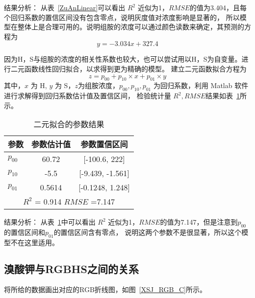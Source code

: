     结果分析： 从表~\ref{ZuAnLinear}可以看出 $R^2$ 近似为1，$RMSE$的值为3.404，且每个回归系数的置信区间没有包含零点，说明灰度值对浓度影响是显著的，
    所以模型在整体上是合理可用的。说明组胺的浓度可以通过颜色读数来确定，其预测的方程为
    $$y = -3.034x + 327.4 $$
    
    因为H，S与组胺的浓度的相关性系数也较大，也可以尝试用以H，S为自变量。进行二元函数线性回归拟合，以求得到更为精确的模型。
    建立二元函数拟合方程为
    $$ z = p_{00} + p_{10} \times x + p_{01} \times y$$
    其中，$x$ 为 H, $y$ 为 S，$z$为组胺浓度，$p_{00},p_{10},p_{01}$ 为回归系数，利用 Matlab 软件进行求解得到回归系数估计值及置信区间，
    检验统计量 $R^2, RMSE $结果如表~\ref{ZuAn2Dim}所示。

    \begin{table}[H]
        \centering
        \caption{二元拟合的参数结果}
        \label{ZuAn2Dim}
        \begin{tabular}{@{}lcc@{}}
        \toprule
        参数       & 参数估计值  & 参数置信区间                       \\ \midrule
        $p_{00}$ & 60.72  & {[}-100.6, 222{]}    \\
        $p_{10}$ & -5.5   & {[}-9.439, -1.561{]} \\
        $p_{01}$ & 0.5614 & {[}-0.1248, 1.248{]} \\
        \hline
        \multicolumn{3}{c}{$R^2$ = 0.914 $RMSE$ =7.147}  \\ \bottomrule
        \end{tabular}
        \end{table}

    结果分析： 从表~\ref{ZuAn2Dim}中可以看出 $R^2$ 近似为1，$RMSE$的值为7.147，但是注意到$p_{00}$的置信区间和$p_{01}$的置信区间含有零点，
    说明这两个参数不是很显著，所以这个模型不在这里适用。

\subsection{溴酸钾与RGBHS之间的关系}

    将所给的数据画出对应的RGB折线图，如图~\ref{XSJ_RGB_C}所示。


